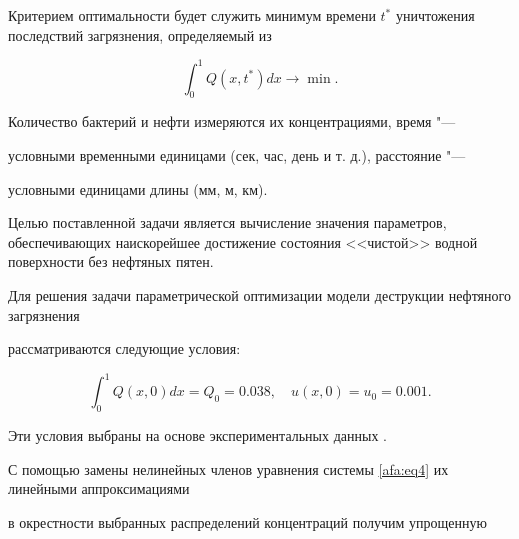 Критерием оптимальности будет служить минимум времени $t^*$ уничтожения последствий загрязнения, определяемый из

\begin{equation}

\label{afa:eq5}


\int _0^1 Q(x, t^*) dx 


\to \min .

\end{equation}



Количество бактерий и нефти измеряются их концентрациями, время "--- 

условными временными единицами (сек, час, день и т. д.), расстояние "--- 

условными единицами длины (мм, м, км).






Целью поставленной задачи является вычисление значения параметров, обеспечивающих наискорейшее достижение состояния <<чистой>> водной поверхности без нефтяных пятен. 

Для решения задачи параметрической оптимизации модели деструкции нефтяного загрязнения

рассматриваются следующие условия: 

\begin{equation}

\label{afa:boundary1}

\int_0^1 Q(x, 0)dx =Q_0=0.038,\quad  u(x, 0)=u_0=0.001.

\end{equation}

Эти условия выбраны на основе экспериментальных данных \cite{afa:add:3}.




\smallskip




С помощью замены нелинейных членов уравнения системы \eqref{afa:eq4} их линейными аппроксимациями

в окрестности выбранных распределений концентраций получим упрощенную

